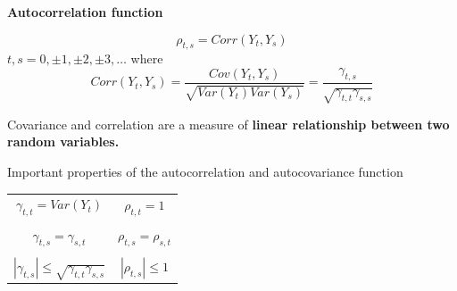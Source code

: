 \documentclass[12pt]{article} %
\begin{document}
\medskip


\noindent\textbf
{Autocorrelation function}

$$\rho_{t,s}= Corr(Y_t,Y_s)$$
$ t,s=0, \pm 1, \pm 2, \pm 3, \dots $
where $$Corr(Y_t,Y_s)=\dfrac{Cov(Y_t,Y_s)}{\sqrt{Var(Y_t) Var(Y_s)}}=
\dfrac{\gamma_{t,s}}{\sqrt{\gamma_{t,t }\gamma_{s,s}}} $$

Covariance and correlation are a measure of \bf{linear} relationship between two random variables.


\newpage
{Important properties of the autocorrelation and autocovariance function}
\begin{table}
\begin{tabular}{cc}
$\gamma_{t,t}=Var(Y_t)$ & $\rho_{t,t}=1$\\ \\
$\gamma_{t,s}=\gamma_{s,t}$ & $\rho_{t,s}=\rho_{s,t}$\\ \\
$|\gamma_{t,s}|\leq \sqrt{\gamma_{t,t} \gamma_{s,s}}$ & $|\rho_{t,s}|\leq 1$
\end{tabular}
\end{table}

%
\end{document}
